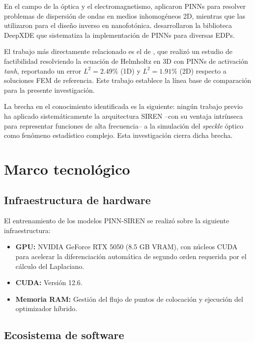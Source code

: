 En el campo de la óptica y el electromagnetismo, \textcite{fang2020physics}
aplicaron PINNs para resolver problemas de dispersión de ondas en medios
inhomogéneos 2D, mientras que \textcite{chen2020physics} las utilizaron para
el diseño inverso en nanofotónica. \textcite{lu2021deepxde} desarrollaron la
biblioteca DeepXDE que sistematiza la implementación de PINNs para diversas EDPs.

El trabajo más directamente relacionado es el de \textcite{schoder2024helmholtz},
que realizó un estudio de factibilidad resolviendo la ecuación de Helmholtz en
3D con PINNs de activación \textit{tanh}, reportando un error $L^2 = 2.49\%$
(1D) y $L^2 = 1.91\%$ (2D) respecto a soluciones FEM de referencia. Este
trabajo establece la línea base de comparación para la presente investigación.

La brecha en el conocimiento identificada es la siguiente: ningún trabajo
previo ha aplicado sistemáticamente la arquitectura SIREN \parencite{sitzmann2020siren}
--con su ventaja intrínseca para representar funciones de alta frecuencia--
a la simulación del \textit{speckle} óptico como fenómeno estadístico complejo.
Esta investigación cierra dicha brecha.

\section{Marco tecnológico}

\subsection{Infraestructura de hardware}

El entrenamiento de los modelos PINN-SIREN se realizó sobre la siguiente
infraestructura:

\begin{itemize}
    \item \textbf{GPU:} NVIDIA GeForce RTX 5050 (8.5 GB VRAM), con núcleos
    CUDA para acelerar la diferenciación automática de segundo orden requerida
    por el cálculo del Laplaciano.
    \item \textbf{CUDA:} Versión 12.6.
    \item \textbf{Memoria RAM:} Gestión del flujo de puntos de colocación y
    ejecución del optimizador híbrido.
\end{itemize}

\subsection{Ecosistema de software}


